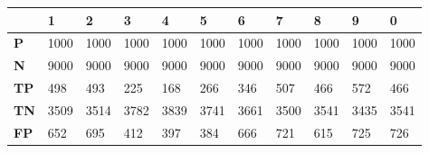 \documentclass[a4paper]{article}
\begin{document}
\begin{table}[H]
    \centering
    \begin{tabular}{l|l|l|l|l|l|l|l|l|l|l|}
        \cline{2-11}
                                           & \textbf{1}                    & \textbf{2}                    & \textbf{3}                    & \textbf{4}                    & \textbf{5}                    & \textbf{6}                    & \textbf{7}                    & \textbf{8}                    & \textbf{9}                    & \textbf{0}                    \\ \hline
        \multicolumn{1}{|l|}{\textbf{P}}   & 1000                          & 1000                          & 1000                          & 1000                          & 1000                          & 1000                          & 1000                          & 1000                          & 1000                          & 1000                          \\ \hline
        \multicolumn{1}{|l|}{\textbf{N}}   & 9000                          & 9000                          & 9000                          & 9000                          & 9000                          & 9000                          & 9000                          & 9000                          & 9000                          & 9000                          \\ \hline
        \multicolumn{1}{|l|}{\textbf{TP}}  & 498                           & 493                           & 225                           & 168                           & 266                           & 346                           & 507                           & 466                           & 572                           & 466                           \\ \hline
        \multicolumn{1}{|l|}{\textbf{TN}}  & 3509                          & 3514                          & 3782                          & 3839                          & 3741                          & 3661                          & 3500                          & 3541                          & 3435                          & 3541                          \\ \hline
        \multicolumn{1}{|l|}{\textbf{FP}}  & 652                           & 695                           & 412                           & 397                           & 384                           & 666                           & 721                           & 615                           & 725                           & 726                           \\ \hline

\end{tabular}
\end{table}
\end{document}
